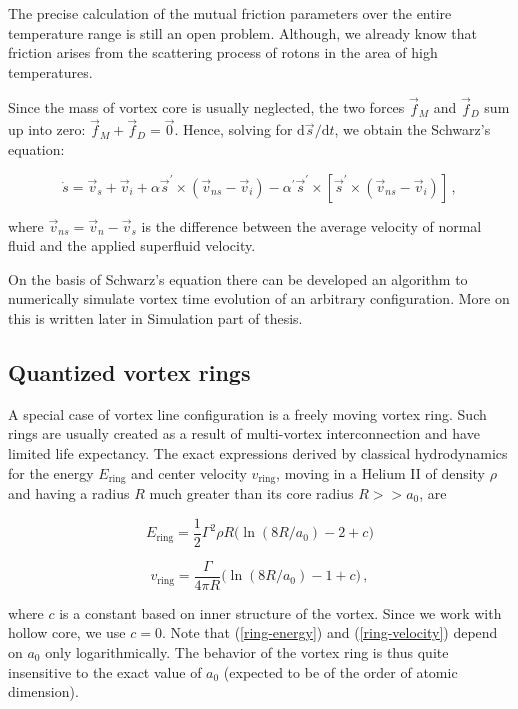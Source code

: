 The precise calculation of the mutual friction parameters over the entire temperature range is still an open problem. Although, we already know that friction arises from the scattering process of rotons in the area of high temperatures.

Since the mass of vortex core is usually neglected, the two forces $\vec{f}_M$ and $\vec{f}_D$ sum up into zero: $\vec{f}_M + \vec{f}_D = \vec{0}$. Hence, solving for $\text{d}\vec{s} / \text{d} t$, we obtain the Schwarz's equation:

\begin{equation}
\dot{s} = \vec{v}_s + \vec{v}_i
+ \alpha\vec{s}^{\prime} \times (\vec{v}_{ns} - \vec{v}_i)
- \alpha^{\prime}\vec{s}^{\prime} \times [\vec{s}^{\prime} \times (\vec{v}_{ns} - \vec{v}_i)]\,,
\end{equation}

where $\vec{v}_{ns} = \vec{v}_n - \vec{v}_s$ is the difference between the average velocity of normal fluid and the applied superfluid velocity.

On the basis of Schwarz's equation there can be developed an algorithm to numerically simulate vortex time evolution of an arbitrary configuration. More on this is written later in Simulation part of thesis.

\subsection*{Quantized vortex rings}

A special case of vortex line configuration is a freely moving vortex ring. Such rings are usually created as a result of multi-vortex interconnection and have limited life expectancy. The exact expressions derived by classical hydrodynamics for the energy $E_{\text{ring}}$ and center velocity $v_{\text{ring}}$, moving in a Helium II of density $\rho$ and
having a radius $R$ much greater than its core radius $R >> a_0$, are

\begin{equation}
E_{\text{ring}} = \frac{1}{2}\Gamma^2 \rho R \Big(\ln(8R/a_0) - 2 + c\Big)
\label{ring-energy}
\end{equation}

\begin{equation}
v_{\text{ring}} = \frac{\Gamma}{4\pi R} \Big(\ln(8R/a_0) - 1 + c\Big)\,,
\label{ring-velocity}
\end{equation}

where $c$ is a constant based on inner structure of the vortex. Since we work with hollow core, we use
$c = 0$. Note that (\ref{ring-energy}) and (\ref{ring-velocity}) depend on $a_0$ only logarithmically.
The behavior of the vortex ring is thus quite insensitive to the exact value of $a_0$ (expected to be of the order of atomic dimension).

